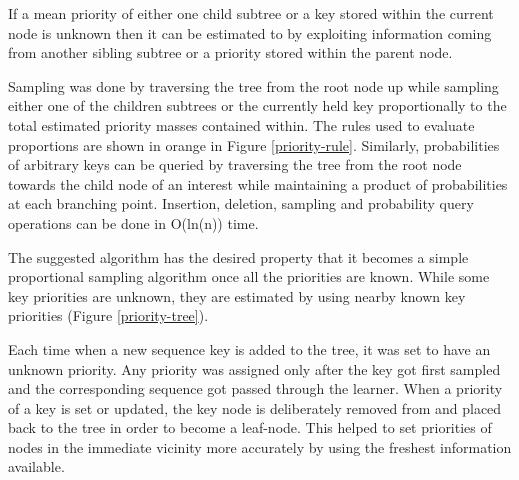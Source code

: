 \documentclass{article}
\begin{document}
If a mean priority of either one child subtree or a key 
stored within the current node is unknown then it can be estimated to by 
exploiting information coming from another sibling subtree or a priority 
stored within the parent node.

Sampling was done by traversing the tree from the root node up while sampling 
either one of the children subtrees or the currently held key proportionally to 
the total estimated priority masses contained within. The rules used to 
evaluate proportions are shown in orange in Figure 
\ref{priority-rule}. Similarly, probabilities of arbitrary keys can be queried 
by traversing the tree from the root node towards the child node of an interest 
while maintaining a product of probabilities at each branching point. 
Insertion, 
deletion, sampling and probability query operations can be done in O(ln(n)) 
time.

The suggested algorithm has the desired property that it becomes a simple 
proportional sampling algorithm once all the priorities are known. While 
some key priorities are unknown, they are estimated by using nearby known 
key priorities (Figure \ref{priority-tree}).

Each time when a new sequence key is added to the tree, it was set to have an 
unknown priority. Any priority was assigned only after the key got first 
sampled and the corresponding sequence got passed through the learner. When a 
priority of a key is set or updated, the key node is deliberately removed from 
and placed back to the tree in order to become a leaf-node. This helped to 
set priorities of nodes in the immediate vicinity more accurately by using the 
freshest information available.
\end{document}
